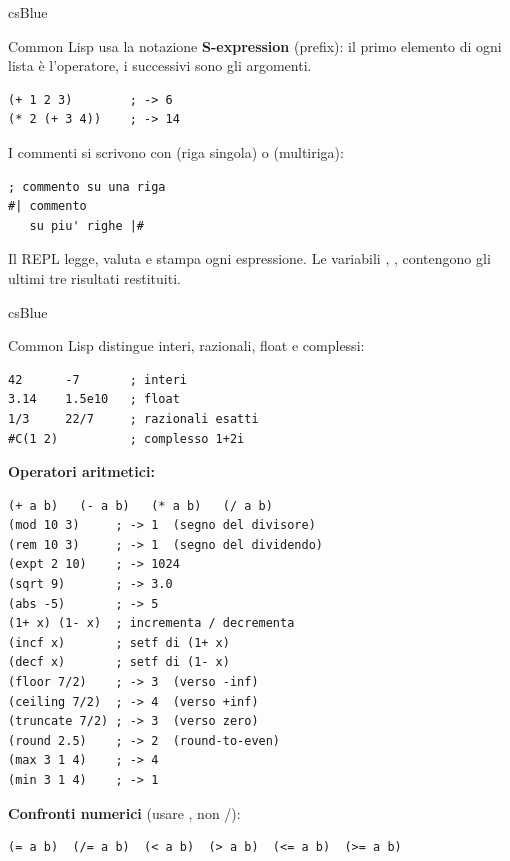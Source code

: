 \vspace{16pt}


\begin{refbox}{csBlue}
\label{sec:repl}

Common Lisp usa la notazione \textbf{S-expression} (prefix):
il primo elemento di ogni lista è l'operatore, i successivi
sono gli argomenti.

\begin{lstlisting}
(+ 1 2 3)        ; -> 6
(* 2 (+ 3 4))    ; -> 14
\end{lstlisting}

I commenti si scrivono con \fn{;} (riga singola) o
 (multiriga):

\begin{lstlisting}
; commento su una riga
#| commento
   su piu' righe |#
\end{lstlisting}

Il REPL legge, valuta e stampa ogni espressione.
Le variabili \fn{*}, \fn{**}, \fn{***} contengono gli ultimi
tre risultati restituiti.

\end{refbox}

\begin{refbox}[Numeri]{csBlue}
\label{sec:numeri}

Common Lisp distingue interi, razionali, float e complessi:

\begin{lstlisting}
42      -7       ; interi
3.14    1.5e10   ; float
1/3     22/7     ; razionali esatti
#C(1 2)          ; complesso 1+2i
\end{lstlisting}

\textbf{Operatori aritmetici:}\nopagebreak

\begin{lstlisting}
(+ a b)   (- a b)   (* a b)   (/ a b)
(mod 10 3)     ; -> 1  (segno del divisore)
(rem 10 3)     ; -> 1  (segno del dividendo)
(expt 2 10)    ; -> 1024
(sqrt 9)       ; -> 3.0
(abs -5)       ; -> 5
(1+ x) (1- x)  ; incrementa / decrementa
(incf x)       ; setf di (1+ x)
(decf x)       ; setf di (1- x)
(floor 7/2)    ; -> 3  (verso -inf)
(ceiling 7/2)  ; -> 4  (verso +inf)
(truncate 7/2) ; -> 3  (verso zero)
(round 2.5)    ; -> 2  (round-to-even)
(max 3 1 4)    ; -> 4
(min 3 1 4)    ; -> 1
\end{lstlisting}

\textbf{Confronti numerici} (usare \fn{=}, non /):\nopagebreak

\begin{lstlisting}
(= a b)  (/= a b)  (< a b)  (> a b)  (<= a b)  (>= a b)
\end{lstlisting}

\end{refbox}

